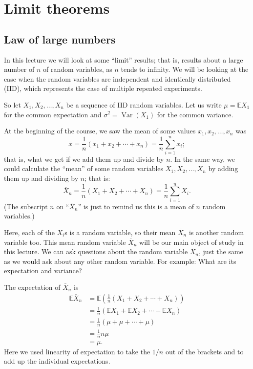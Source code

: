 \documentclass[
  a4paper,
]{book}
\theoremstyle{definition}
\theoremstyle{definition}
\theoremstyle{definition}
\theoremstyle{definition}
\theoremstyle{remark}
\begin{document}
\hypertarget{L18-limit}{%
\chapter{Limit theorems}\label{L18-limit}}

\hypertarget{lln}{%
\section{Law of large numbers}\label{lln}}

In this lecture we will look at some ``limit'' results; that is, results about a large number of \(n\) of random variables, as \(n\) tends to infinity. We will be looking at the case when the random variables are independent and identically distributed (IID), which represents the case of multiple repeated experiments.

So let \(X_1, X_2, \dots, X_n\) be a sequence of IID random variables. Let us write \(\mu = \mathbb EX_1\) for the common expectation and \(\sigma^2 = \operatorname{Var}(X_1)\) for the common variance.

At the beginning of the course, we saw the mean of some values \(x_1, x_2, \dots, x_n\) was
\[ \bar x = \frac{1}{n} (x_1 + x_2 + \cdots + x_n) = \frac{1}{n} \sum_{i=1}^n x_i ; \]
that is, what we get if we add them up and divide by \(n\). In the same way, we could calculate the ``mean'' of some random variables \(X_1, X_2, \dots, X_n\) by adding them up and dividing by \(n\); that is:
\[ \overline X_n = \frac{1}{n} (X_1 + X_2 + \cdots + X_n) = \frac{1}{n} \sum_{i=1}^n X_i . \]
(The subscript \(n\) on ``\(\overline X_n\)'' is just to remind us this is a mean of \(n\) random variables.)

Here, each of the \(X_i\)s is a random variable, so their mean \(\overline X_n\) is another random variable too. This mean random variable \(\overline X_n\) will be our main object of study in this lecture. We can ask questions about the random variable \(\overline X_n\), just the same as we would ask about any other random variable. For example: What are its expectation and variance?

The expectation of \(\bar X_n\) is
\begin{align*}
\mathbb E \overline X_n &= \mathbb E \left( \frac{1}{n} (X_1 + X_2 + \cdots + X_n)\right) \\
&=   \frac{1}{n} (\mathbb EX_1 + \mathbb EX_2 + \cdots + \mathbb EX_n)\\
&= \frac{1}{n} (\mu + \mu + \cdots + \mu)\\
&= \frac{1}{n} n \mu \\
&= \mu .
\end{align*}
Here we used linearity of expectation to take the \(1/n\) out of the brackets and to add up the individual expectations.
\end{document}
